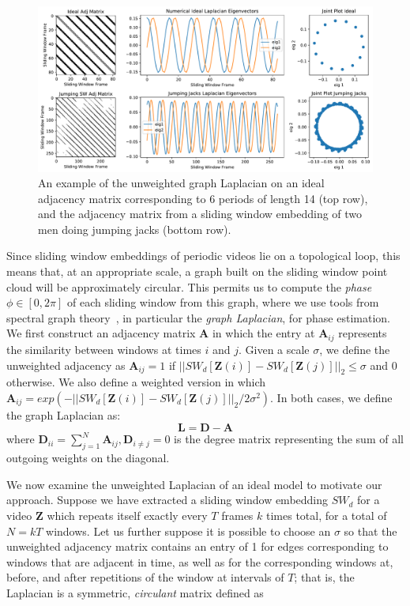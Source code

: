 \documentclass{article}
\newcommand{\mb}{\mathbf}
\begin{document}
\begin{figure}[h!]
\centering
\includegraphics[width=\columnwidth]{CirculantExample.pdf}
\caption{An example of the unweighted graph Laplacian on an ideal adjacency matrix corresponding to 6 periods of length 14 (top row), and the adjacency matrix from a sliding window embedding of two men doing jumping jacks (bottom row).  }
\label{fig:CirculantExample}
\end{figure}

Since sliding window embeddings of periodic videos lie on a topological loop, this means that, at an appropriate scale, a graph built on the sliding window point cloud will be approximately circular.  This permits us to compute the {\em phase} $\phi \in [0, 2\pi]$ of each sliding window from this graph, where we use tools from spectral graph theory~\cite{chung1997spectral}, in particular the {\em graph Laplacian}, for phase estimation. We first construct an adjacency matrix $\mb{A}$ in which the entry at $\mb{A}_{ij}$ represents the similarity between windows at times $i$ and $j$.  Given a scale $\sigma$, we define the unweighted adjacency as $\mb{A}_{ij} = 1$ if $||SW_{d}[\mb{Z}(i)] - SW_{d}[\mb{Z}(j)]||_2 \leq \sigma$ and 0 otherwise. We also define a weighted version in which $\mb{A}_{ij} = exp(-||SW_{d}[\mb{Z}(i)] - SW_{d}[\mb{Z}(j)]||_2/2\sigma^2)$. In both cases, we define the graph Laplacian as:
\begin{equation}
	\mb{L} = \mb{D}-\mb{A}
\end{equation}
where $\mb{D}_{ii} = \sum_{j = 1}^N \mb{A}_{ij}, \mb{D}_{i \neq j} = 0$ is the degree matrix representing the sum of all outgoing weights on the diagonal.  

We now examine the unweighted Laplacian of an ideal model to motivate our approach.  Suppose we have extracted a sliding window embedding $SW_{d}$ for a video $\mb{Z}$ which repeats itself exactly every $T$ frames $k$ times total, for a total of $N = kT$ windows.  Let us further suppose it is possible to choose an $\sigma$ so that the unweighted adjacency matrix contains an entry of 1 for edges corresponding to windows that are adjacent in time, as well as for the corresponding windows at, before, and after repetitions of the window at intervals of $T$; that is, the Laplacian is a symmetric, {\em circulant} matrix defined as
\end{document}
